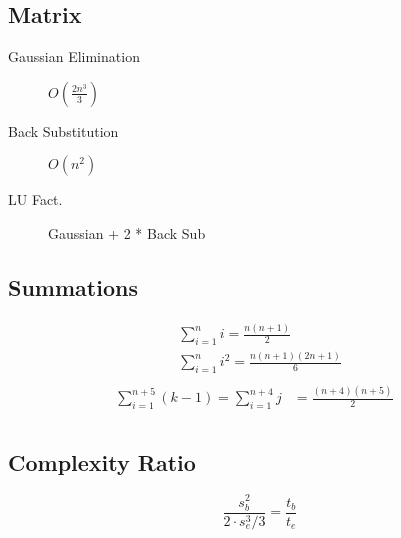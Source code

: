 \documentclass[10pt]{article}
\begin{document}
\begin{multicols}{3}
    \begin{minipage}{\columnwidth}
        \subsection*{Matrix}
        \begin{description}
            \item[Gaussian Elimination] \(O(\frac{2n^3}{3})\)
            \item[Back Substitution] \(O(n^2)\)
            \item[LU Fact.] Gaussian + 2 * Back Sub
        \end{description}
    \end{minipage}

    \begin{minipage}{\columnwidth}
        \subsection*{Summations}
        \begin{multicols}{2}
            \vspace*{-2em}
            \begin{equation*}
                \begin{aligned}
                     & \sum_{i=1}^{n} i = \frac{n(n+1)}{2}         & \\
                     & \sum_{i=1}^{n} i^2 = \frac{n(n+1)(2n+1)}{6} & \\
                \end{aligned}
            \end{equation*}
            \columnbreak
            \vspace*{-2.0em}
            \begin{equation*}
                \begin{aligned}
                    \sum_{i=1}^{n+5}{(k-1)} = \sum_{i=1}^{n+4} j & = \frac{(n+4)(n+5)}{2} & \\
                \end{aligned}
            \end{equation*}
        \end{multicols}
    \end{minipage}

    \begin{minipage}{1.3\columnwidth}
        \begin{center}
            \subsection*{Complexity Ratio}
        \end{center}
        \begin{equation*}
            \frac{s_b^2}{2\cdot s_e^3 / 3} = \frac{t_b}{t_e}
        \end{equation*}
    \end{minipage}
\end{multicols}
\end{document}
